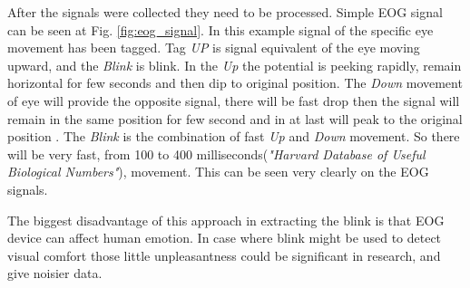 \documentclass[conference]{IEEEtran}
\newcommand{\Ref}[1]{Fig. \ref{#1}}
\begin{document}
After the signals were collected they need to be processed. Simple EOG signal can be seen at \Ref{fig:eog_signal}. In this example signal of the specific eye movement has been tagged. Tag \textit{UP} is signal equivalent of the eye moving upward, and the \textit{Blink} is blink. In the \textit{Up} the potential is peeking rapidly, remain horizontal for few seconds and then 
dip to original position. The \textit{Down} movement of eye will provide the opposite signal, there will be fast drop then the signal will remain in the same position for few second and in at last will peak to the original position . The \textit{Blink} is the combination of fast \textit{Up} and \textit{Down} movement. So there will be very fast, from 100 to 400 milliseconds(\textit{"Harvard Database of Useful Biological Numbers"}), movement. This can be seen very clearly on the EOG signals.\par The biggest disadvantage of this approach in extracting the blink is that EOG device can affect human emotion. In case where blink might be used to detect visual comfort those little unpleasantness could be significant in research, and give noisier data.
\end{document}
